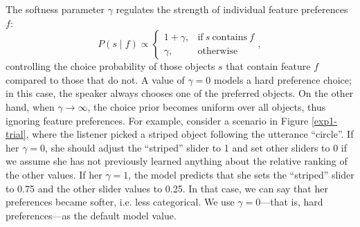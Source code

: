 \documentclass[10pt,a4paper]{article}
\begin{document}
The softness parameter $\gamma$ regulates the strength of individual feature preferences $f$:
\begin{equation}
P(s \mid f) \propto \begin{cases}
1 + \gamma, & \text{if}\ s\ \text{contains}\ f \\
\gamma, & \text{otherwise}
\end{cases},
\end{equation}
controlling the choice probability of those objects $s$ that contain feature $f$ compared to those that do not.  
A value of $\gamma=0$ models a hard preference choice; in this case, the speaker always chooses one of the preferred objects. 
On the other hand, when $\gamma \rightarrow \infty$, the choice prior becomes uniform over all objects, thus ignoring feature preferences. 
For example, consider a scenario in Figure \ref{exp1-trial}, where the listener picked a striped object following the utterance ``circle''. If her $\gamma=0$, she should adjust the ``striped'' slider to 1 and set other sliders to 0 if we assume she has not previously learned anything about the relative ranking of the other values. If her $\gamma=1$, the model predicts that she sets the ``striped'' slider to 0.75 and the other slider values to 0.25. In that case, we can say that her preferences became softer, i.e. less categorical.
% 
We use $\gamma=0$---that is, hard preferences---as the default model value.
\end{document}
